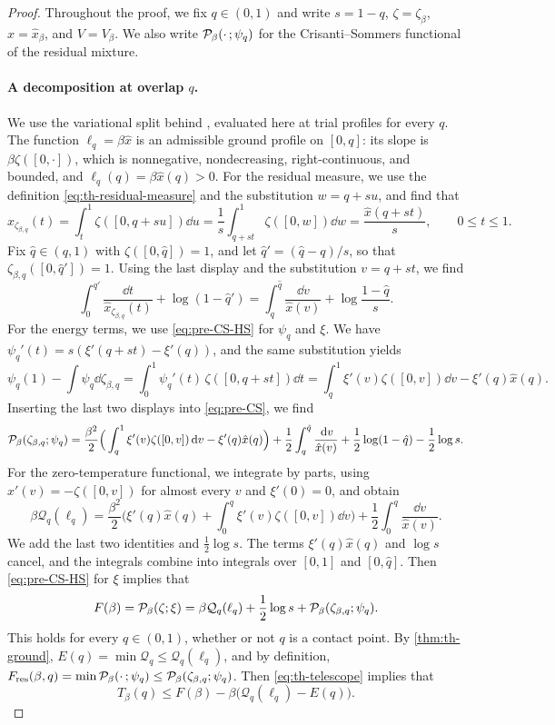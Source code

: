 \begin{proof}
Throughout the proof, we fix $q\in(0,1)$ and write $s=1-q$, $\zeta=\zeta_\beta$, $\hat x=\hat x_\beta$, and $V=V_\beta$. We also write $\mathcal P_\beta(\cdot\,;\psi_q)$ for the Crisanti--Sommers functional of the residual mixture.

\paragraph{A decomposition at overlap $q$.}
We use the variational split behind \cite[proof of Lemma~34, (6.8)]{Subag2024}, evaluated here at trial profiles for every $q$. The function $\ell_q=\beta\hat x$ is an admissible ground profile on $[0,q]$: its slope is $\beta\zeta([0,\cdot])$, which is nonnegative, nondecreasing, right-continuous, and bounded, and $\ell_q(q)=\beta\hat x(q)>0$. For the residual measure, we use the definition \eqref{eq:th-residual-measure} and the substitution $w=q+su$, and find that
\[
\hat x_{\zeta_{\beta,q}}(t)=\int_t^1\zeta([0,q+su])\dd u=\frac1s\int_{q+st}^1\zeta([0,w])\dd w=\frac{\hat x(q+st)}s,\qquad 0\le t\le1.
\]
Fix $\hat q\in(q,1)$ with $\zeta([0,\hat q])=1$, and let $\hat q'=(\hat q-q)/s$, so that $\zeta_{\beta,q}([0,\hat q'])=1$. Using the last display and the substitution $v=q+st$, we find
\[
\int_0^{\hat q'}\frac{\dd t}{\hat x_{\zeta_{\beta,q}}(t)}+\log(1-\hat q')=\int_q^{\hat q}\frac{\dd v}{\hat x(v)}+\log\frac{1-\hat q}s.
\]
For the energy terms, we use \eqref{eq:pre-CS-HS} for $\psi_q$ and $\xi$. We have $\psi_q'(t)=s(\xi'(q+st)-\xi'(q))$, and the same substitution yields
\[
\psi_q(1)-\int\psi_q\dd\zeta_{\beta,q}=\int_0^1\psi_q'(t)\,\zeta([0,q+st])\dd t=\int_q^1\xi'(v)\zeta([0,v])\dd v-\xi'(q)\hat x(q).
\]
Inserting the last two displays into \eqref{eq:pre-CS}, we find
\[
\mathcal P_\beta(\zeta_{\beta,q};\psi_q)=\frac{\beta^2}2\Big(\int_q^1\xi'(v)\zeta([0,v])\,\mathrm d v-\xi'(q)\hat x(q)\Big)+\frac12\int_q^{\hat q}\frac{\,\mathrm d v}{\hat x(v)}+\frac12\log(1-\hat q)-\frac12\log s.
\]
For the zero-temperature functional, we integrate by parts, using $\hat x'(v)=-\zeta([0,v])$ for almost every $v$ and $\xi'(0)=0$, and obtain
\[
\beta\mathcal Q_q(\ell_q)=\frac{\beta^2}2\Big(\xi'(q)\hat x(q)+\int_0^q\xi'(v)\zeta([0,v])\dd v\Big)+\frac12\int_0^q\frac{\dd v}{\hat x(v)}.
\]
We add the last two identities and $\frac12\log s$. The terms $\xi'(q)\hat x(q)$ and $\log s$ cancel, and the integrals combine into integrals over $[0,1]$ and $[0,\hat q]$. Then \eqref{eq:pre-CS-HS} for $\xi$ implies that
\begin{equation}\label{eq:th-telescope}
F(\beta)=\mathcal P_\beta(\zeta;\xi)=\beta\mathcal Q_q(\ell_q)+\frac12\log s+\mathcal P_\beta(\zeta_{\beta,q};\psi_q).
\end{equation}
This holds for every $q\in(0,1)$, whether or not $q$ is a contact point. By \cref{thm:th-ground}, $E(q)=\min\mathcal Q_q\le\mathcal Q_q(\ell_q)$, and by definition, $F_{\rm res}(\beta,q)=\min\mathcal P_\beta(\cdot\,;\psi_q)\le\mathcal P_\beta(\zeta_{\beta,q};\psi_q)$. Then \eqref{eq:th-telescope} implies that
\begin{equation}\label{eq:th-trial}
T_\beta(q)\le F(\beta)-\beta\big(\mathcal Q_q(\ell_q)-E(q)\big).
\end{equation}


\end{proof}
